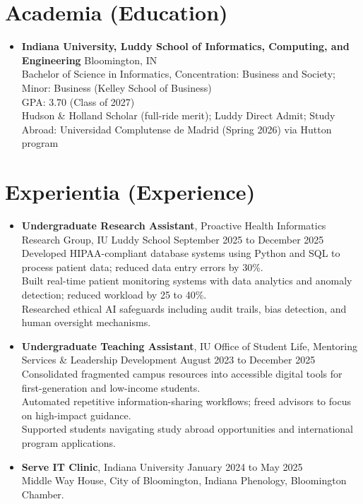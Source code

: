 \documentclass[11pt]{article}
\begin{document}
\section*{Academia (Education)}
\begin{itemize}[leftmargin=*]
    \item \textbf{Indiana University, Luddy School of Informatics, Computing, and Engineering} Bloomington, IN\\
    Bachelor of Science in Informatics, Concentration: Business and Society; Minor: Business (Kelley School of Business)\\
    GPA: 3.70 (Class of 2027)\\
    Hudson \& Holland Scholar (full-ride merit); Luddy Direct Admit; Study Abroad: Universidad Complutense de Madrid (Spring 2026) via Hutton program
 \end{itemize}

\section*{Experientia (Experience)}
\begin{itemize}[leftmargin=*]
    \item \textbf{Undergraduate Research Assistant}, Proactive Health Informatics Research Group, IU Luddy School \hfill September 2025 to December 2025\\
    Developed HIPAA-compliant database systems using Python and SQL to process patient data; reduced data entry errors by 30\%.\\
    Built real-time patient monitoring systems with data analytics and anomaly detection; reduced workload by 25 to 40\%.\\
    Researched ethical AI safeguards including audit trails, bias detection, and human oversight mechanisms.

    \item \textbf{Undergraduate Teaching Assistant}, IU Office of Student Life, Mentoring Services \& Leadership Development \hfill August 2023 to December 2025\\
    Consolidated fragmented campus resources into accessible digital tools for first-generation and low-income students.\\
    Automated repetitive information-sharing workflows; freed advisors to focus on high-impact guidance.\\
    Supported students navigating study abroad opportunities and international program applications.

    \item \textbf{Serve IT Clinic}, Indiana University \hfill January 2024 to May 2025\\
    Middle Way House, City of Bloomington, Indiana Phenology, Bloomington Chamber.
\end{itemize}
\end{document}
